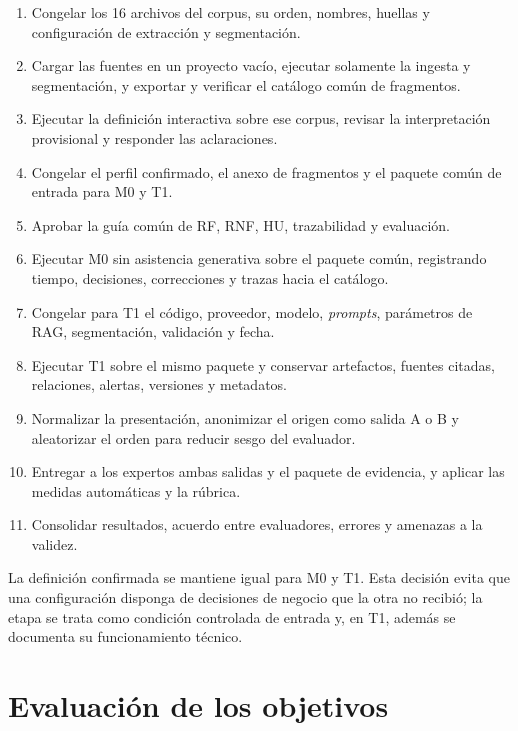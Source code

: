 \begin{enumerate}
  \item Congelar los 16 archivos del corpus, su orden, nombres, huellas y configuración de extracción y segmentación.
  \item Cargar las fuentes en un proyecto vacío, ejecutar solamente la ingesta y segmentación, y exportar y verificar el catálogo común de fragmentos.
  \item Ejecutar la definición interactiva sobre ese corpus, revisar la interpretación provisional y responder las aclaraciones.
  \item Congelar el perfil confirmado, el anexo de fragmentos  y el paquete común de entrada para M0 y T1.
  \item Aprobar la guía común de RF, RNF, HU, trazabilidad y evaluación.
  \item Ejecutar M0 sin asistencia generativa sobre el paquete común, registrando tiempo, decisiones, correcciones y trazas hacia el catálogo.
  \item Congelar para T1 el código, proveedor, modelo, \emph{prompts}, parámetros de RAG, segmentación, validación y fecha.
  \item Ejecutar T1 sobre el mismo paquete y conservar artefactos, fuentes citadas, relaciones, alertas, versiones y metadatos.
  \item Normalizar la presentación, anonimizar el origen como salida A o B y aleatorizar el orden para reducir sesgo del evaluador.
  \item Entregar a los expertos ambas salidas y el paquete de evidencia, y aplicar las medidas automáticas y la rúbrica.
  \item Consolidar resultados, acuerdo entre evaluadores, errores y amenazas a la validez.
\end{enumerate}

La definición confirmada se mantiene igual para M0 y T1. Esta decisión evita que una configuración disponga de decisiones de negocio que la otra no recibió; la etapa se trata como condición controlada de entrada y, en T1, además se documenta su funcionamiento técnico.

\section{Evaluación de los objetivos}

